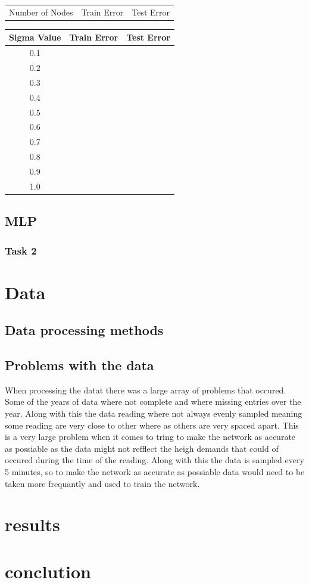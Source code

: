 \documentclass{IEEEtran}
\begin{document}
\begin{center}
\begin{tabular}{||c c c||}
  \hline
Number of Nodes & Train Error & Test Error \\ [0.5ex]
\end{tabular}
\end{center}
\begin{center}
\begin{tabular}{||c c c||}
  \hline
Sigma Value & Train Error & Test Error \\ [0.5ex]
\hline
0.1 \\
0.2 \\
0.3 \\
0.4 \\
0.5 \\
0.6 \\
0.7 \\
0.8 \\
0.9 \\
1.0 \\
\hline
\end{tabular}
\end{center}
\subsection{MLP}
\subsubsection{Task 2}
\section{Data}
\subsection{Data processing methods}
\subsection{Problems with the data}
\begin{flushleft}
  When processing the datat there was a large array of problems that occured. Some of the years of data where not
  complete and where missing entries over the year. Along with this the data reading where not always evenly sampled
  meaning some reading are very close to other where as others are very spaced apart. This is a very large problem when
  it comes to tring to make the network as accurate as possiable as the data might not refflect the heigh demands that
  could of occured during the time of the reading. Along with this the data is sampled every 5 minutes, so to make the
  network as accurate as possiable data would need to be taken more frequantly and used to train the network.
\end{flushleft}
\section{results}
\section{conclution}
\end{document}
